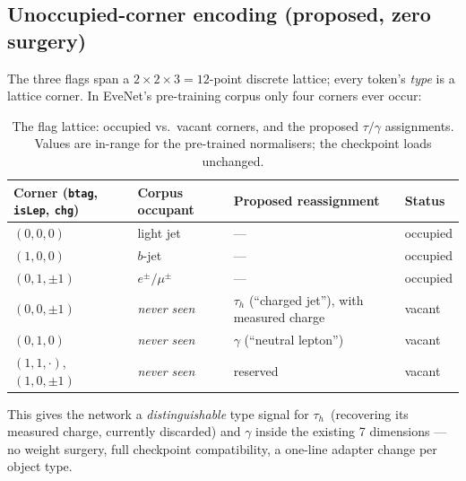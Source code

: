 \documentclass[11pt]{article}
\newcommand{\tauh}{\ensuremath{\tau_h}}
\begin{document}
\subsection{Unoccupied-corner encoding (proposed, zero surgery)}
The three flags span a $2\times2\times3=12$-point discrete lattice; every
token's \emph{type} is a lattice corner. In EveNet's pre-training corpus only
four corners ever occur:

\begin{table}[h]
\centering\small
\begin{tabular}{@{}llll@{}}
\toprule
\textbf{Corner} (\texttt{btag}, \texttt{isLep}, \texttt{chg}) &
\textbf{Corpus occupant} & \textbf{Proposed reassignment} & \textbf{Status} \\
\midrule
$(0,0,0)$   & light jet        & --- & occupied \\
$(1,0,0)$   & $b$-jet          & --- & occupied \\
$(0,1,\pm1)$& $e^\pm/\mu^\pm$  & --- & occupied \\
$(0,0,\pm1)$& \emph{never seen} & \textbf{\tauh} (``charged jet''), with
  measured charge & vacant \\
$(0,1,0)$   & \emph{never seen} & \textbf{$\gamma$} (``neutral lepton'') & vacant \\
$(1,1,\cdot)$, $(1,0,\pm1)$ & \emph{never seen} & reserved & vacant \\
\bottomrule
\end{tabular}
\caption{The flag lattice: occupied vs.\ vacant corners, and the proposed
$\tau/\gamma$ assignments. Values are in-range for the pre-trained
normalisers; the checkpoint loads unchanged.}
\label{tab:corners}
\end{table}

\noindent
This gives the network a \emph{distinguishable} type signal for \tauh\
(recovering its measured charge, currently discarded) and $\gamma$ inside the
existing 7 dimensions --- no weight surgery, full checkpoint compatibility,
a one-line adapter change per object type.
\end{document}
